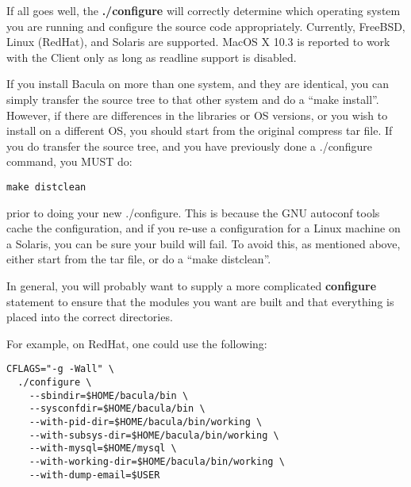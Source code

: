\begin{enumerate}
{\footnotesize
\begin{verbatim}
      make uninstall
      make distclean
      ./configure (your-new-options)
      make
      make install
      
\end{verbatim}
\normalsize

\end{enumerate}

If all goes well, the {\bf ./configure} will correctly determine which
operating system you are running and configure the source code appropriately.
Currently, FreeBSD, Linux (RedHat), and Solaris are supported. MacOS X 10.3 is
reported to work with the Client only as long as readline support is disabled.


If you install Bacula on more than one system, and they are identical, you can
simply transfer the source tree to that other system and do a ``make
install''. However, if there are differences in the libraries or OS versions,
or you wish to install on a different OS, you should start from the original
compress tar file. If you do transfer the source tree, and you have previously
done a ./configure command, you MUST do: 

\footnotesize
\begin{verbatim}
make distclean
\end{verbatim}
\normalsize

prior to doing your new ./configure. This is because the GNU autoconf tools
cache the configuration, and if you re-use a configuration for a Linux machine
on a Solaris, you can be sure your build will fail. To avoid this, as
mentioned above, either start from the tar file, or do a ``make distclean''. 

In general, you will probably want to supply a more complicated {\bf
configure} statement to ensure that the modules you want are built and that
everything is placed into the correct directories. 

For example, on RedHat, one could use the following: 

\footnotesize
\begin{verbatim}
CFLAGS="-g -Wall" \
  ./configure \
    --sbindir=$HOME/bacula/bin \
    --sysconfdir=$HOME/bacula/bin \
    --with-pid-dir=$HOME/bacula/bin/working \
    --with-subsys-dir=$HOME/bacula/bin/working \
    --with-mysql=$HOME/mysql \
    --with-working-dir=$HOME/bacula/bin/working \
    --with-dump-email=$USER
\end{verbatim}
\normalsize

